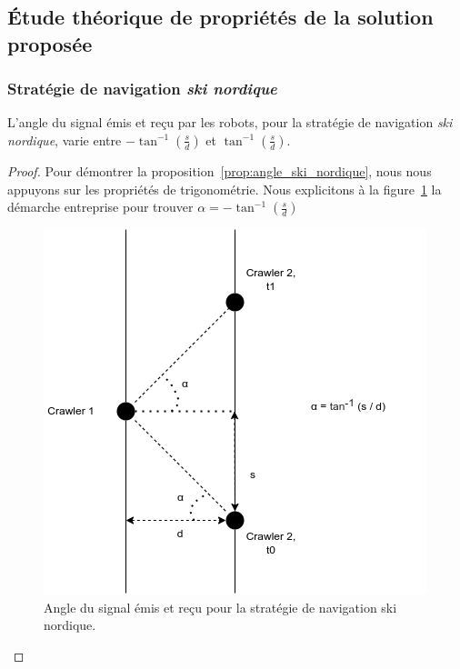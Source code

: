 \documentclass[francais,RandD]{rapportPFE}
\begin{document}
		\subsection{Étude théorique de propriétés de la solution proposée}
			\subsubsection*{Stratégie de navigation \textit{ski nordique}}
				\begin{Proposition}
					L'angle du signal émis et reçu par les robots, pour la stratégie de navigation \textit{ski nordique}, varie entre $-\tan^{-1}(\frac{s}{d})$ et $\tan^{-1}(\frac{s}{d})$.
					\label{prop:angle_ski_nordique}
				\end{Proposition}
				\begin{proof}
					Pour démontrer la proposition~\ref{prop:angle_ski_nordique}, nous nous appuyons sur les propriétés de trigonométrie.
					Nous explicitons à la figure~\ref{fig:angle_ski_nordique} la démarche entreprise pour trouver $\alpha = -\tan^{-1}(\frac{s}{d})$

					\begin{figure}[h!]
						\centering
						\includegraphics[scale=0.5]{graphics/angle_ski_nordique.png}
						\caption{Angle du signal émis et reçu pour la stratégie de navigation ski nordique.}
						\label{fig:angle_ski_nordique}
					\end{figure}
				\end{proof}
\end{document}
